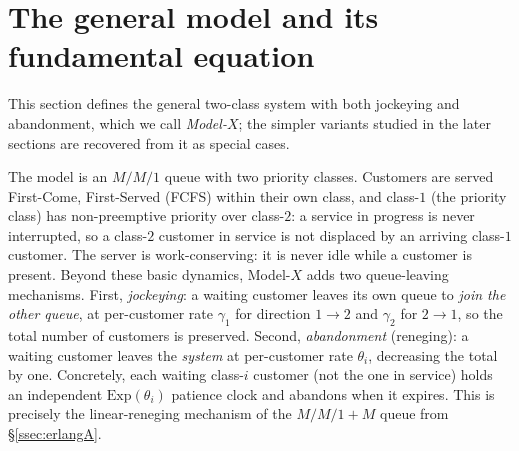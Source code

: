 \section{The general model and its fundamental equation}\label{sec:model_x}

This section defines the general two-class system with both jockeying and abandonment, which we call \emph{Model-$X$}; the simpler variants studied in the later sections are recovered from it as special cases.

The model is an $M/M/1$ queue with two priority classes. Customers are served First-Come, First-Served (FCFS) within their own class, and class-$1$ (the priority class) has non-preemptive priority over class-$2$: a service in progress is never interrupted, so a class-$2$ customer in service is not displaced by an arriving class-$1$ customer. The server is work-conserving: it is never idle while a customer is present. Beyond these basic dynamics, Model-$X$ adds two queue-leaving mechanisms. First, \emph{jockeying}: a waiting customer leaves its own queue to \emph{join the other queue}, at per-customer rate $\gamma_1$ for direction $1\to2$ and $\gamma_2$ for $2\to1$, so the total number of customers is preserved. Second, \emph{abandonment} (reneging): a waiting customer leaves the \emph{system} at per-customer rate $\theta_i$, decreasing the total by one. Concretely, each waiting class-$i$ customer (not the one in service) holds an independent $\mathrm{Exp}(\theta_i)$ patience clock and abandons when it expires. This is precisely the linear-reneging mechanism of the $M/M/1+M$ queue from \S\ref{ssec:erlangA}.

